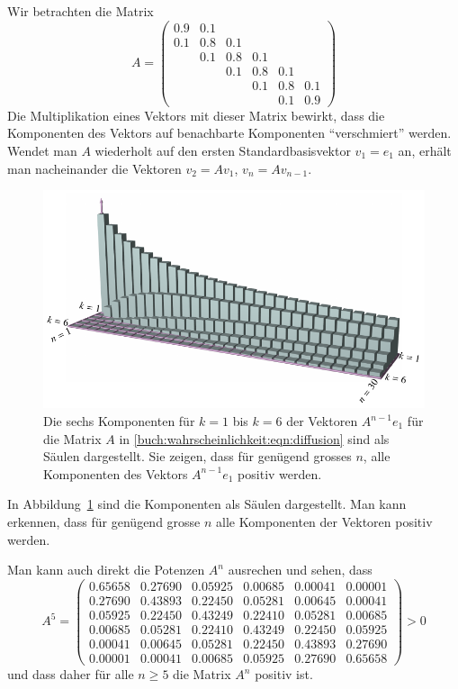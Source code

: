 \begin{beispiel}
Wir betrachten die Matrix
\begin{equation}
A=
\begin{pmatrix}
0.9&0.1&   &   &   &   \\
0.1&0.8&0.1&   &   &   \\
   &0.1&0.8&0.1&   &   \\
   &   &0.1&0.8&0.1&   \\
   &   &   &0.1&0.8&0.1\\
   &   &   &   &0.1&0.9
\end{pmatrix}
\label{buch:wahrscheinlichkeit:eqn:diffusion}
\end{equation}
Die Multiplikation eines Vektors mit dieser Matrix bewirkt, dass die
Komponenten des Vektors auf benachbarte Komponenten ``verschmiert'' werden.
Wendet man $A$ wiederholt auf den ersten Standardbasisvektor $v_1=e_1$ an,
erhält man nacheinander die Vektoren $v_2=Av_1$, $v_n = Av_{n-1}$.
\begin{figure}
\centering
\includegraphics{chapters/80-wahrscheinlichkeit/images/diffusion.pdf}
\caption{Die sechs Komponenten für $k=1$ bis $k=6$ der Vektoren $A^{n-1}e_1$
für die Matrix $A$ in \eqref{buch:wahrscheinlichkeit:eqn:diffusion}
sind als Säulen dargestellt.
Sie zeigen, dass für genügend grosses $n$, alle Komponenten
des Vektors $A^{n-1}e_1$ positiv werden.
\label{buch:wahrscheinlichkeit:fig:diffusion}}
\end{figure}
In Abbildung~\ref{buch:wahrscheinlichkeit:fig:diffusion} sind die Komponenten
als Säulen dargestellt.
Man kann erkennen, dass für genügend grosse $n$ alle Komponenten
der Vektoren positiv werden.

Man kann auch direkt die Potenzen $A^n$ ausrechen und sehen, dass
\[
A^5
=
\begin{pmatrix}
   0.65658&  0.27690&  0.05925&  0.00685&  0.00041&  0.00001\\
   0.27690&  0.43893&  0.22450&  0.05281&  0.00645&  0.00041\\
   0.05925&  0.22450&  0.43249&  0.22410&  0.05281&  0.00685\\
   0.00685&  0.05281&  0.22410&  0.43249&  0.22450&  0.05925\\
   0.00041&  0.00645&  0.05281&  0.22450&  0.43893&  0.27690\\
   0.00001&  0.00041&  0.00685&  0.05925&  0.27690&  0.65658
\end{pmatrix}
>0
\]
und dass daher für alle $n\ge 5$ die Matrix $A^n$ positiv ist.
\end{beispiel}

